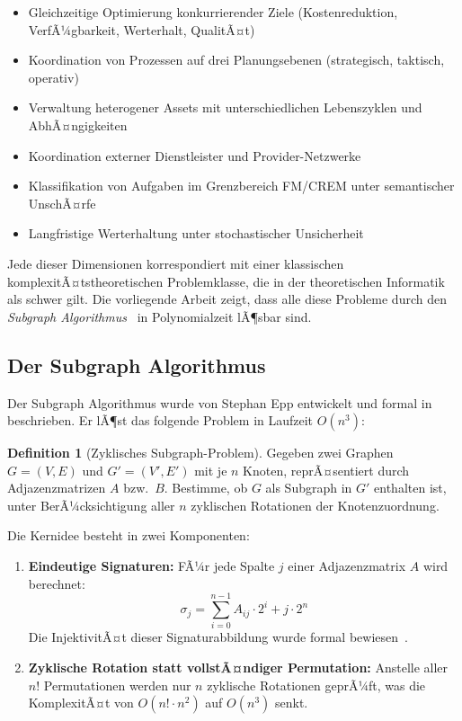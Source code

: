 ﻿\documentclass[a4paper,12pt]{article}
\theoremstyle{definition}
\newtheorem{definition}{Definition}[section]
\begin{document}
\begin{itemize}
    \item Gleichzeitige Optimierung konkurrierender Ziele (Kostenreduktion, VerfÃ¼gbarkeit,
          Werterhalt, QualitÃ¤t)
    \item Koordination von Prozessen auf drei Planungsebenen (strategisch, taktisch, operativ)
    \item Verwaltung heterogener Assets mit unterschiedlichen Lebenszyklen und AbhÃ¤ngigkeiten
    \item Koordination externer Dienstleister und Provider-Netzwerke
    \item Klassifikation von Aufgaben im Grenzbereich FM/CREM unter semantischer Un\-schÃ¤rfe
    \item Langfristige Werterhaltung unter stochastischer Unsicherheit
\end{itemize}

Jede dieser Dimensionen korrespondiert mit einer klassischen komplexitÃ¤tstheoretischen
Problemklasse, die in der theoretischen Informatik als schwer gilt.
Die vorliegende Arbeit zeigt, dass alle diese Probleme durch den
\emph{Subgraph Algorithmus}~\cite{epp2026subgraph} in Polynomialzeit lÃ¶sbar sind.

\subsection{Der Subgraph Algorithmus}

Der Subgraph Algorithmus wurde von Stephan Epp entwickelt und formal in~\cite{epp2026subgraph}
beschrieben. Er lÃ¶st das folgende Problem in Laufzeit $O(n^3)$:

\begin{definition}[Zyklisches Subgraph-Problem]
\label{def:zsub}
Gegeben zwei Graphen $G = (V, E)$ und $G' = (V', E')$ mit je $n$ Knoten,
reprÃ¤sentiert durch Adjazenzmatrizen $A$ bzw.\ $B$.
Bestimme, ob $G$ als Subgraph in $G'$ enthalten ist, unter BerÃ¼cksichtigung
aller $n$ zyklischen Rotationen der Knotenzuordnung.
\end{definition}

Die Kernidee besteht in zwei Komponenten:
\begin{enumerate}
    \item \textbf{Eindeutige Signaturen:} FÃ¼r jede Spalte $j$ einer Adjazenzmatrix $A$
          wird berechnet:
          \[
              \sigma_j = \sum_{i=0}^{n-1} A_{ij} \cdot 2^i + j \cdot 2^n
          \]
          Die InjektivitÃ¤t dieser Signaturabbildung wurde formal bewiesen~\cite{epp2026subgraph}.

    \item \textbf{Zyklische Rotation statt vollstÃ¤ndiger Permutation:}
          Anstelle aller $n!$ Permutationen werden nur $n$ zyklische Rotationen geprÃ¼ft,
          was die KomplexitÃ¤t von $O(n! \cdot n^2)$ auf $O(n^3)$ senkt.
\end{enumerate}
\end{document}
